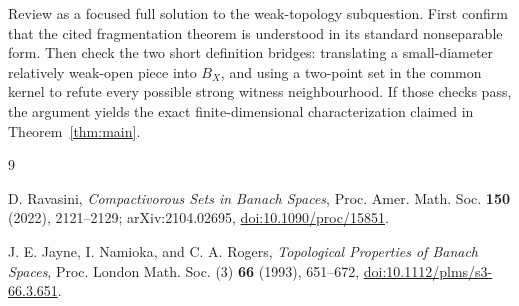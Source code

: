 \documentclass[11pt]{article}
\begin{document}
Review as a focused full solution to the weak-topology subquestion.  First
confirm that the cited fragmentation theorem is understood in its standard
nonseparable form.  Then check the two short definition bridges: translating
a small-diameter relatively weak-open piece into $B_X$, and using a two-point
set in the common kernel to refute every possible strong witness
neighbourhood.  If those checks pass, the argument yields the exact
finite-dimensional characterization claimed in Theorem~\ref{thm:main}.

\begin{thebibliography}{9}

D. Ravasini,
\emph{Compactivorous Sets in Banach Spaces},
Proc. Amer. Math. Soc. \textbf{150} (2022), 2121--2129;
arXiv:2104.02695,
\href{https://doi.org/10.1090/proc/15851}{doi:10.1090/proc/15851}.

J. E. Jayne, I. Namioka, and C. A. Rogers,
\emph{Topological Properties of Banach Spaces},
Proc. London Math. Soc. (3) \textbf{66} (1993), 651--672,
\href{https://doi.org/10.1112/plms/s3-66.3.651}{doi:10.1112/plms/s3-66.3.651}.

\end{thebibliography}
\end{document}
